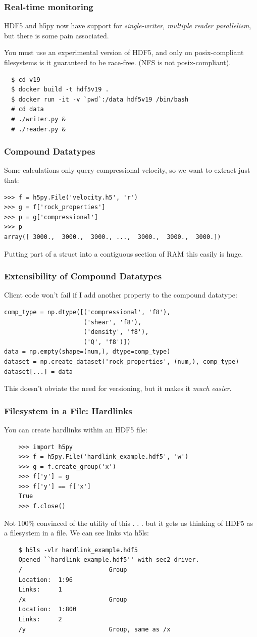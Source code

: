 \documentclass[9pt]{beamer}
\begin{document}
\begin{frame}[fragile]
  \frametitle{Real-time monitoring}
  HDF5 and h5py now have support for \emph{single-writer, multiple reader parallelism}, but there is some pain associated.

  You must use an experimental version of HDF5, and only on posix-compliant filesystems is it guaranteed to be race-free. (NFS is not posix-compliant).
  \begin{verbatim}
  $ cd v19
  $ docker build -t hdf5v19 .
  $ docker run -it -v `pwd`:/data hdf5v19 /bin/bash
  # cd data
  # ./writer.py &
  # ./reader.py &
  \end{verbatim}	
\end{frame}


\begin{frame}[fragile]
\frametitle{Compound Datatypes}
Some calculations only query compressional velocity, so we want to extract just that:
\begin{verbatim}
>>> f = h5py.File('velocity.h5', 'r')
>>> g = f['rock_properties']
>>> p = g['compressional']
>>> p
array([ 3000.,  3000.,  3000., ...,  3000.,  3000.,  3000.])
\end{verbatim}
Putting part of a struct into a contiguous section of RAM this easily is huge.
\end{frame}

\begin{frame}[fragile]
\frametitle{Extensibility of Compound Datatypes}
Client code won't fail if I add another property to the compound datatype:
\begin{verbatim}
comp_type = np.dtype([('compressional', 'f8'),
                      ('shear', 'f8'),
                      ('density', 'f8'),
                      ('Q', 'f8')])
data = np.empty(shape=(num,), dtype=comp_type) 
dataset = np.create_dataset('rock_properties', (num,), comp_type)
dataset[...] = data
\end{verbatim}
This doesn't obviate the need for versioning, but it makes it \emph{much easier}.
\end{frame}


\begin{frame}[fragile]
  \frametitle{Filesystem in a File: Hardlinks}
  You can create hardlinks within an HDF5 file:
  \begin{verbatim}
    >>> import h5py
    >>> f = h5py.File('hardlink_example.hdf5', 'w')
    >>> g = f.create_group('x')
    >>> f['y'] = g
    >>> f['y'] == f['x']
    True
    >>> f.close()
  \end{verbatim}
  Not 100\% convinced of the utility of this . . . but it gets us thinking of HDF5 as a filesystem in a file. We can see links via h5ls:
  \begin{verbatim}
    $ h5ls -vlr hardlink_example.hdf5
    Opened ``hardlink_example.hdf5'' with sec2 driver.
    /                        Group
    Location:  1:96
    Links:     1
    /x                       Group
    Location:  1:800
    Links:     2
    /y                       Group, same as /x
  \end{verbatim}
\end{frame}
\end{document}
